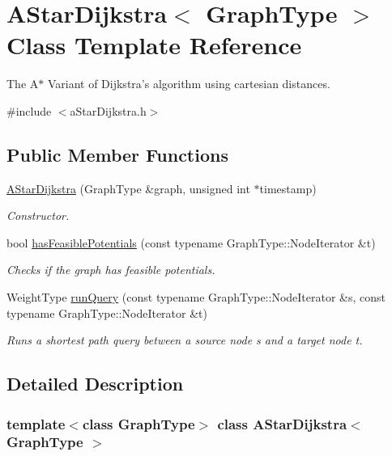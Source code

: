 \hypertarget{class_a_star_dijkstra}{
\section{AStarDijkstra$<$ GraphType $>$ Class Template Reference}
\label{class_a_star_dijkstra}
}


The A$\ast$ Variant of Dijkstra's algorithm using cartesian distances.  




{\ttfamily \#include $<$aStarDijkstra.h$>$}

\subsection*{Public Member Functions}
\begin{DoxyCompactItemize}
\item 
\hyperlink{class_a_star_dijkstra_a3537728567fd96dd0e934e953de24a9a}{AStarDijkstra} (GraphType \&graph, unsigned int $\ast$timestamp)
\begin{DoxyCompactList}\small\item\em Constructor. \item\end{DoxyCompactList}\item 
bool \hyperlink{class_a_star_dijkstra_a382abeb0b9328f55ce3ecf21e5c937d8}{hasFeasiblePotentials} (const typename GraphType::NodeIterator \&t)
\begin{DoxyCompactList}\small\item\em Checks if the graph has feasible potentials. \item\end{DoxyCompactList}\item 
WeightType \hyperlink{class_a_star_dijkstra_a8a11eb938a4608e119e6fb8ebd82e097}{runQuery} (const typename GraphType::NodeIterator \&s, const typename GraphType::NodeIterator \&t)
\begin{DoxyCompactList}\small\item\em Runs a shortest path query between a source node s and a target node t. \item\end{DoxyCompactList}\end{DoxyCompactItemize}


\subsection{Detailed Description}
\subsubsection*{template$<$class GraphType$>$ class AStarDijkstra$<$ GraphType $>$}

